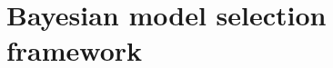 \documentclass{article}
\begin{document}


\section{Bayesian model selection framework}
\label{s:bayes}
\end{document}
